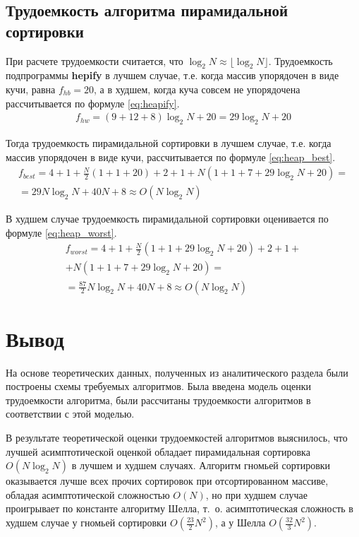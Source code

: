 \subsection{Трудоемкость алгоритма пирамидальной сортировки}
При расчете трудоемкости считается, что $\log_{2}N \approx \lfloor \log_{2}N \rfloor$.
Трудоемкость подпрограммы \textbf{hepify} в лучшем случае, т.е. когда массив упорядочен в виде кучи, равна $f_{hb} = 20$, а в худшем, когда куча совсем не упорядочена рассчитывается по формуле \eqref{eq:heapify}.
\begin{equation}
	\label{eq:heapify}
	\begin{gathered}
		f_{hw} = (9 + 12 + 8) \log_{2}N + 20 = 29 \log_{2}N + 20
	\end{gathered}
\end{equation}

Тогда трудоемкость пирамидальной сортировки в лучшем случае, т.е. когда массив упорядочен в виде кучи, рассчитывается по формуле \eqref{eq:heap_best}.
\begin{equation}
	\label{eq:heap_best}
	\begin{gathered}
		f_{best} = 4 + 1 + \frac{N}{2}(1 + 1 + 20) + 2 + 1 + N (1 + 1 + 7 + 29 \log_{2}N + 20) = \\
		= 29 N \log_{2}N + 40N + 8 \approx O(N \log_{2}N)
	\end{gathered}
\end{equation}

В худшем случае трудоемкость пирамидальной сортировки оценивается по формуле \eqref{eq:heap_worst}.
\begin{equation}
	\label{eq:heap_worst}
	\begin{gathered}
		f_{worst} = 4 + 1 + \frac{N}{2}(1 + 1 + 29 \log_{2}N + 20) + 2 + 1 +\\
		+ N (1 + 1 + 7 + 29 \log_{2}N + 20) = \\
		= \frac{87}{2} N \log_{2}N + 40N + 8 \approx O(N \log_{2}N)
	\end{gathered}
\end{equation}

\section*{Вывод}
На основе теоретических данных, полученных из аналитического раздела были построены схемы требуемых алгоритмов. 
Была введена модель оценки трудоемкости алгоритма, были рассчитаны трудоемкости алгоритмов в соответствии с этой моделью.

В результате теоретической оценки трудоемкостей алгоритмов выяснилось, что лучшей асимптотической оценкой обладает пирамидальная сортировка $O(N \log_{2}N)$ в лучшем и худшем случаях. Алгоритм гномьей сортировки оказывается лучше всех прочих сортировок при отсортированном массиве, обладая асимптотической сложностью $O(N)$, но при худшем случае проигрывает по константе алгоритму Шелла, т.~о. асимптотическая сложность в худшем случае у гномьей сортировки $O(\frac{23}{2}N^2)$, а у Шелла $O(\frac{32}{3} N ^ 2)$.